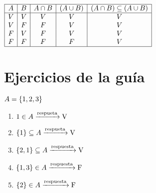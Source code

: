 \documentclass[12pt,a4paper, spanish]{article}
\begin{document}
\begin{enumerate}[label=\arabic*)]
	      $\begin{array}{|c|c|c|c|c|}
			      \hline
			      A & B & A \cap B & (A \cup B) & (A \cap B) \subseteq (A \cup B) \\ \hline
			      V & V & V          & V            & V                                   \\
			      V & F & F          & V            & V                                   \\
			      F & V & F          & V            & V                                   \\
			      F & F & F          & F            & V                                   \\ \hline
		      \end{array}
	      $
\end{enumerate}

\newpage
\section*{Ejercicios de la guía}

\ejercicio
$A = \left\{ 1,2,3 \right\}$
\begin{multicols}{2}
	\begin{enumerate}[label=(\roman*)]
		\item $1 \en A \flecha{respueta} \text{V}$
		\item $\set{1} \subseteq A \flecha{respueta} \text{V}$
		\item $\set{2,1} \subseteq A \flecha{respuesta} \text{V}$
		\item $\set{1,3} \en A \flecha{respuesta} \text{F}$
		\item $\set{2} \en A \flecha{respuesta} \text{F}$
	\end{enumerate}
\end{multicols}
\end{document}
